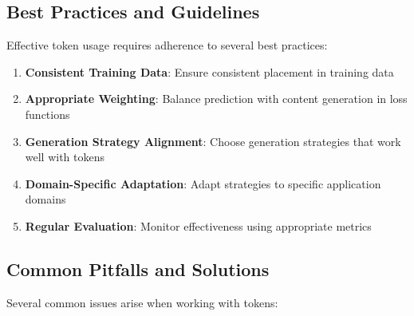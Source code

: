 \subsection{Best Practices and Guidelines}

Effective \eos{} token usage requires adherence to several best practices:

\begin{enumerate}
\item \textbf{Consistent Training Data}: Ensure consistent \eos{} placement in training data
\item \textbf{Appropriate Weighting}: Balance \eos{} prediction with content generation in loss functions
\item \textbf{Generation Strategy Alignment}: Choose generation strategies that work well with \eos{} tokens
\item \textbf{Domain-Specific Adaptation}: Adapt \eos{} strategies to specific application domains
\item \textbf{Regular Evaluation}: Monitor \eos{} effectiveness using appropriate metrics
\end{enumerate}
\begin{comment}
Feedback: This list is good. To make it more actionable:
1.  **Consistent Training Data**: "Double-check your data pipeline to ensure that *every* training example has a correctly placed [EOS] token. Inconsistent data is a common source of poor termination behavior."
2.  **Generation Strategy Alignment**: "Be aware that sampling methods (top-k, nucleus) can sometimes 'sample around' the [EOS] token even when its probability is high. If precise termination is critical, consider using greedy decoding or beam search, or implementing a hard probability threshold for the [EOS] token."
3.  **Regular Evaluation**: "Don't just rely on BLEU or ROUGE. Create a 'length distribution' plot of your generated text versus your test set. If the distributions are wildly different, it's a strong sign that your model's [EOS] handling is miscalibrated."

STATUS: addressed - made best practices more actionable with specific pipeline and evaluation guidance
\end{comment}

\subsection{Common Pitfalls and Solutions}

Several common issues arise when working with \eos{} tokens:

